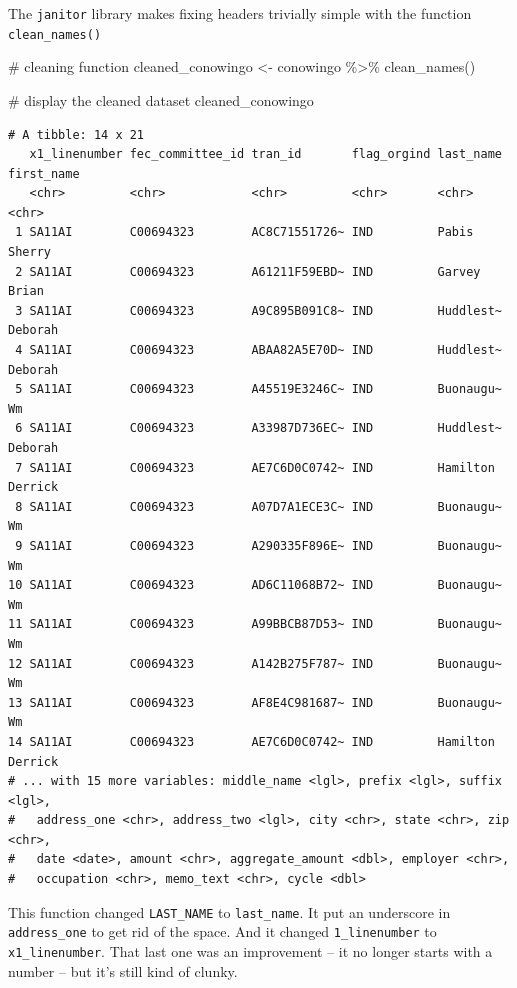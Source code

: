 \documentclass[
  letterpaper,
  DIV=11,
  numbers=noendperiod]{scrreprt}
\newenvironment{Shaded}{\begin{snugshade}}{\end{snugshade}}
\newcommand{\CommentTok}[1]{\textcolor[rgb]{0.37,0.37,0.37}{#1}}
\newcommand{\FunctionTok}[1]{\textcolor[rgb]{0.28,0.35,0.67}{#1}}
\newcommand{\NormalTok}[1]{\textcolor[rgb]{0.00,0.23,0.31}{#1}}
\newcommand{\OtherTok}[1]{\textcolor[rgb]{0.00,0.23,0.31}{#1}}
\newcommand{\SpecialCharTok}[1]{\textcolor[rgb]{0.37,0.37,0.37}{#1}}
\begin{document}
The \texttt{janitor} library makes fixing headers trivially simple with
the function \texttt{clean\_names()}

\begin{Shaded}
\begin{Highlighting}[]
\CommentTok{\# cleaning function}
\NormalTok{cleaned\_conowingo }\OtherTok{\textless{}{-}}\NormalTok{ conowingo }\SpecialCharTok{\%\textgreater{}\%}
  \FunctionTok{clean\_names}\NormalTok{()}

\CommentTok{\# display the cleaned dataset}
\NormalTok{cleaned\_conowingo}
\end{Highlighting}
\end{Shaded}

\begin{verbatim}
# A tibble: 14 x 21
   x1_linenumber fec_committee_id tran_id       flag_orgind last_name first_name
   <chr>         <chr>            <chr>         <chr>       <chr>     <chr>     
 1 SA11AI        C00694323        AC8C71551726~ IND         Pabis     Sherry    
 2 SA11AI        C00694323        A61211F59EBD~ IND         Garvey    Brian     
 3 SA11AI        C00694323        A9C895B091C8~ IND         Huddlest~ Deborah   
 4 SA11AI        C00694323        ABAA82A5E70D~ IND         Huddlest~ Deborah   
 5 SA11AI        C00694323        A45519E3246C~ IND         Buonaugu~ Wm        
 6 SA11AI        C00694323        A33987D736EC~ IND         Huddlest~ Deborah   
 7 SA11AI        C00694323        AE7C6D0C0742~ IND         Hamilton  Derrick   
 8 SA11AI        C00694323        A07D7A1ECE3C~ IND         Buonaugu~ Wm        
 9 SA11AI        C00694323        A290335F896E~ IND         Buonaugu~ Wm        
10 SA11AI        C00694323        AD6C11068B72~ IND         Buonaugu~ Wm        
11 SA11AI        C00694323        A99BBCB87D53~ IND         Buonaugu~ Wm        
12 SA11AI        C00694323        A142B275F787~ IND         Buonaugu~ Wm        
13 SA11AI        C00694323        AF8E4C981687~ IND         Buonaugu~ Wm        
14 SA11AI        C00694323        AE7C6D0C0742~ IND         Hamilton  Derrick   
# ... with 15 more variables: middle_name <lgl>, prefix <lgl>, suffix <lgl>,
#   address_one <chr>, address_two <lgl>, city <chr>, state <chr>, zip <chr>,
#   date <date>, amount <chr>, aggregate_amount <dbl>, employer <chr>,
#   occupation <chr>, memo_text <chr>, cycle <dbl>
\end{verbatim}

This function changed \texttt{LAST\_NAME} to \texttt{last\_name}. It put
an underscore in \texttt{address\_one} to get rid of the space. And it
changed \texttt{1\_linenumber} to \texttt{x1\_linenumber}. That last one
was an improvement -- it no longer starts with a number -- but it's
still kind of clunky.
\end{document}
